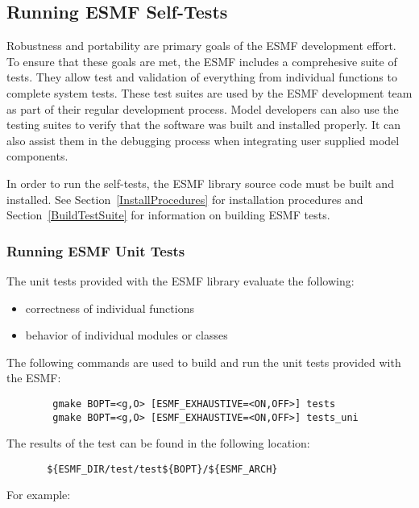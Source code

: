 
\subsection{Running ESMF Self-Tests}
\label{testing}

Robustness and portability are primary goals of the ESMF development effort. To ensure that these goals are met, the ESMF includes a comprehesive suite of tests. They allow test and validation of everything from individual functions to complete system tests. These test suites are used by the ESMF development team as part of their regular development process. Model developers can also use the testing suites to verify that the software was built and installed properly. It can also assist them in the debugging process when integrating user supplied model components. 

In order to run the self-tests, the ESMF library source code must be built and installed.  See 
Section~\ref{InstallProcedures} for installation procedures and Section~\ref{BuildTestSuite} for 
information on building ESMF tests.  

\subsubsection{Running ESMF Unit Tests}

\label{UnitTestDescription}
The unit tests provided with the ESMF library evaluate the following:
\begin{itemize}
\item correctness of individual functions
\item behavior of individual modules or classes
\end{itemize}

\label{RunUnitTests}

The following commands are used to build and run the unit tests provided with the ESMF:
\begin{verbatim}
        gmake BOPT=<g,O> [ESMF_EXHAUSTIVE=<ON,OFF>] tests
        gmake BOPT=<g,O> [ESMF_EXHAUSTIVE=<ON,OFF>] tests_uni
\end{verbatim}

The results of the test can be found in the following location:
\begin{verbatim}
       ${ESMF_DIR/test/test${BOPT}/${ESMF_ARCH}
\end{verbatim}

For example: 


